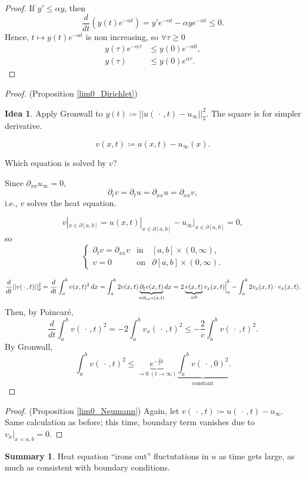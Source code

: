 \documentclass[12pt]{article}
\theoremstyle{definition}
\newtheorem*{summary}{Summary}
\newtheorem*{idea}{Idea}
\begin{document}
\begin{proof}
If $y'\leq\alpha y$, then
\[\frac{d}{dt}(y(t)e^{-\alpha t})=y'e^{-\alpha t}-\alpha ye^{-\alpha t}\leq0.\]
Hence, $t\mapsto y(t)e^{-\alpha t}$ is non increasing, so $\forall\tau\geq0$
\begin{align*}
y(\tau)e^{-\alpha\tau}&\leq y(0)e^{-\alpha0},\\
y(\tau)&\leq y(0)e^{\alpha\tau}.
\end{align*}
\end{proof}

\begin{proof}
(Proposition \ref{lim0_Dirichlet})
\begin{idea}
Apply Gronwall to $y(t)\coloneqq||u(\,\cdot\,,t)-u_{\infty}||_2^2$. The square is for simpler derivative.
\end{idea}

\[v(x,t)\coloneqq u(x,t)-u_{\infty}(x).\]

Which equation is solved by $v$?

Since $\partial_{xx}u_{\infty}=0$,
\[\partial_tv=\partial_tu=\partial_{xx}u=\partial_{xx}v,\]
i.e., $v$ solves the heat equation.

\[v|_{x\in\partial[a,b]}=u(x,t)|_{x\in\partial[a,b]}-u_{\infty}|_{x\in\partial[a,b]}=0,\]
so
\[\left\{\begin{array}{ccc}\partial_tv=\partial_{xx}v&\text{in}&[a,b]\times(0,\infty),\\v=0&\text{on}&\partial[a,b]\times(0,\infty).\end{array}\right.\]

\[\frac{d}{dt}||v(\,\cdot\,,t)||_2^2=\frac{d}{dt}\int_a^bv(x,t)^2\,dx=\int_a^b2v(x,t)\underbrace{\partial_tv(x,t)}_{\mathclap{=\partial_{xx}v(x,t)}}dx=2\underbrace{v(x,t)}_{=0}v_x(x,t)\Big|_{a}^b-\int_a^b2v_x(x,t)\cdot v_x(x,t).\]
Then, by Poincar\'{e},
\[\frac{d}{dt}\int_a^bv(\,\cdot\,,t)^2=-2\int_a^bv_x(\,\cdot\,,t)^2\leq-\frac{2}{c}\int_a^bv(\,\cdot\,,t)^2.\]
By Gronwall,
\[\int_a^bv(\,\cdot\,,t)^2\leq \underbrace{e^{-\frac{2}{c}t}}_{\to0\ (t\to\infty)}\underbrace{\int_a^bv(\,\cdot\,,0)^2}_{\text{constant}}.\]
\end{proof}

\begin{proof}
(Proposition \ref{lim0_Neumann}) Again, let $v(\,\cdot\,,t)\coloneqq u(\,\cdot\,,t)-u_{\infty}$. Same calculation as before; this time, boundary term vanishes due to $v_x|_{x=a,b}=0$.
\end{proof}

\begin{summary}
Heat equation ``irons out'' fluctutations in $u$ as time gets large, as much as consistent with boundary conditions.
\end{summary}
\end{document}

